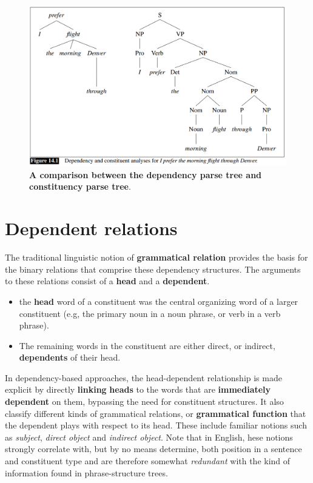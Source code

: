 \documentclass[11pt]{article}
\begin{document}
\begin{figure}
\begin{minipage}[t]{1\linewidth}
  \centering
  \centerline{\includegraphics[scale = 0.3]{dep_constit_tree.png}}
\end{minipage}
\caption{\footnotesize{\textbf{A comparison between the dependency parse tree and constituency parse tree}.}}
\label{fig: dep_constit_tree}
\end{figure}

\section{Dependent relations}
The traditional linguistic notion of \textbf{grammatical relation} provides the basis for the binary relations that comprise these dependency structures. The arguments to these relations consist of a \textbf{head} and a \textbf{dependent}.
\begin{itemize}
\item  the \textbf{head} word of a constituent was the central organizing word of a larger constituent (e.g, the primary noun in a noun phrase, or verb in a verb phrase). 

\item The remaining words in the constituent are either direct, or indirect, \textbf{dependents} of their head. 
\end{itemize}
In dependency-based approaches, the head-dependent relationship is made explicit by directly \textbf{linking} \textbf{heads} to the words that are \textbf{immediately dependent} on them, bypassing the need for constituent structures. It also classify different kinds of grammatical relations, or \textbf{grammatical function} that the
dependent plays with respect to its head. These include familiar notions such as \emph{subject}, \emph{direct object} and \emph{indirect object}. Note that in English, hese notions strongly correlate with, but by no means determine, both position in a sentence and constituent type and are therefore somewhat \emph{redundant} with the kind of information found in phrase-structure trees.
\end{document}
